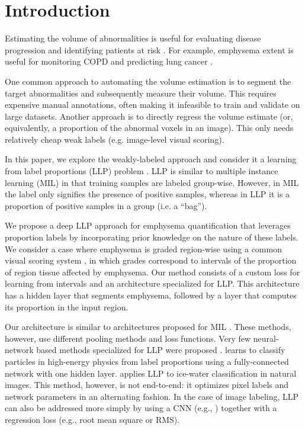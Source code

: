 \documentclass{llncs}
\begin{document}
\section{Introduction}

Estimating the volume of abnormalities is useful for evaluating disease progression and identifying patients at risk \cite{bos2014,cystic2007,Wille2016,Wille2014}.
For example, emphysema extent is useful for monitoring COPD \cite{Wille2014} and predicting lung cancer \cite{Wille2016}.

One common approach to automating the volume estimation is to segment the target abnormalities and subsequently measure their volume.
This requires expensive manual annotations, often making it infeasible to train and validate on large datasets.
Another approach is to directly regress the volume estimate (or, equivalently, a proportion of the abnormal voxels in an image).
This only needs relatively cheap weak labels (e.g. image-level visual scoring).

In this paper, we explore the weakly-labeled approach and consider it a learning from label proportions (LLP) problem \cite{Patrini2014}.
LLP is similar to multiple instance learning (MIL) in that training samples are labeled group-wise.
However, in MIL the label only signifies the presence of positive samples, whereas in LLP it is a proportion of positive samples in a group (i.e. a ``bag'').

We propose a deep LLP approach for emphysema quantification that leverages proportion labels by incorporating prior knowledge on the nature of these labels.
We consider a case where emphysema is graded region-wise using a common visual scoring system \cite{Wille2014}, in which grades correspond to intervals of the proportion of region tissue affected by emphysema.
Our method consists of a custom loss for learning from intervals and an architecture specialized for LLP.
This architecture has a hidden layer that segments emphysema, followed by a layer that computes its proportion in the input region.

Our architecture is similar to architectures proposed for MIL \cite{Wang2018}.
These methods, however, use different pooling methods and loss functions.
Very few neural-network based methods specialized for LLP were proposed \cite{dery2017weakly,li2015alter}.
\cite{dery2017weakly} learns to classify particles in high-energy physics from label proportions using a fully-connected network with one hidden layer.
\cite{li2015alter} applies LLP to ice-water classification in natural images.
This method, however, is not end-to-end: it optimizes pixel labels and network parameters in an alternating fashion.
In the case of image labeling, LLP can also be addressed more simply by using a CNN (e.g., \cite{Dubost2017,He2016}) together with a regression loss (e.g., root mean square or RMS).
\end{document}
